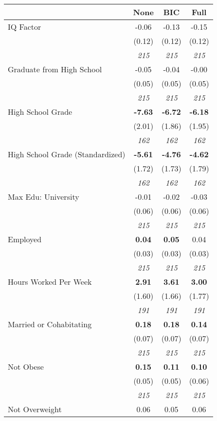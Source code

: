 \begin{tabular}{l c c c}
\toprule
 & None & BIC & Full \\
\midrule
IQ Factor & -0.06 & -0.13 & -0.15 \\
& (0.12) & (0.12) & (0.12) \\
& \textit{ 215 } & \textit{ 215 } & \textit{ 215 } \\
Graduate from High School & -0.05 & -0.04 & -0.00 \\
& (0.05) & (0.05) & (0.05) \\
& \textit{ 215 } & \textit{ 215 } & \textit{ 215 } \\
High School Grade & \textbf{ -7.63 } & \textbf{ -6.72 } & \textbf{ -6.18 } \\
& (2.01) & (1.86) & (1.95) \\
& \textit{ 162 } & \textit{ 162 } & \textit{ 162 } \\
High School Grade (Standardized) & \textbf{ -5.61 } & \textbf{ -4.76 } & \textbf{ -4.62 } \\
& (1.72) & (1.73) & (1.79) \\
& \textit{ 162 } & \textit{ 162 } & \textit{ 162 } \\
Max Edu: University & -0.01 & -0.02 & -0.03 \\
& (0.06) & (0.06) & (0.06) \\
& \textit{ 215 } & \textit{ 215 } & \textit{ 215 } \\
Employed & \textbf{ 0.04 } & \textbf{ 0.05 } & 0.04 \\
& (0.03) & (0.03) & (0.03) \\
& \textit{ 215 } & \textit{ 215 } & \textit{ 215 } \\
Hours Worked Per Week & \textbf{ 2.91 } & \textbf{ 3.61 } & \textbf{ 3.00 } \\
& (1.60) & (1.66) & (1.77) \\
& \textit{ 191 } & \textit{ 191 } & \textit{ 191 } \\
Married or Cohabitating & \textbf{ 0.18 } & \textbf{ 0.18 } & \textbf{ 0.14 } \\
& (0.07) & (0.07) & (0.07) \\
& \textit{ 215 } & \textit{ 215 } & \textit{ 215 } \\
Not Obese & \textbf{ 0.15 } & \textbf{ 0.11 } & \textbf{ 0.10 } \\
& (0.05) & (0.05) & (0.06) \\
& \textit{ 215 } & \textit{ 215 } & \textit{ 215 } \\
Not Overweight & 0.06 & 0.05 & 0.06 \\

\end{tabular}
